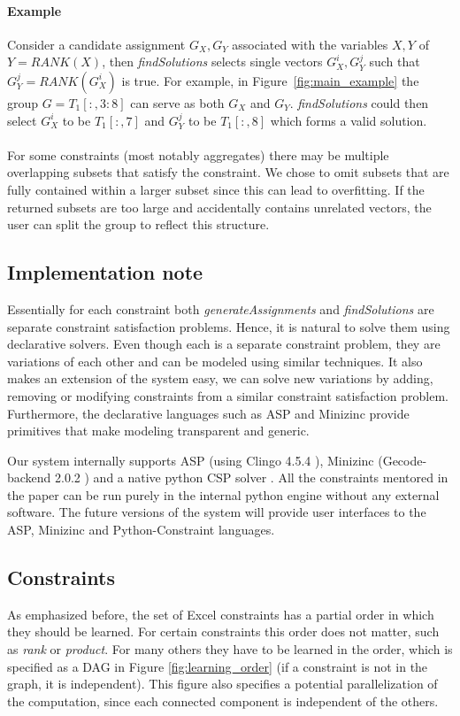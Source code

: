 \documentclass{ecai}
\newcommand{\format}[1]{\textit{#1}\xspace}
\newcommand{\generategroups}{\format{generateAssignments}}
\newcommand{\findassignment}{\format{findSolutions}}
\newcommand{\range}[3]{\ensuremath{#1[#2,#3]}}
\newcommand{\rangeto}[2]{#1{:}#2}
\newcommand{\rangeall}{:}
\newcommand{\ecrank}[2]{\ensuremath{#1 = \mathit{RANK}(#2)}}
\begin{document}
\paragraph{Example}
Consider a candidate assignment $G_X, G_Y$ associated with the variables $X,Y$ of \ecrank{Y}{X}, then \findassignment selects single vectors $G_X^{i}, G_Y^{j}$ such that \ecrank{G_Y^{j}}{G_X^{i}} is true.
For example, in Figure~\ref{fig:main_example} the group $G = \range{T_1}{\rangeall}{\rangeto{3}{8}}$ can serve as both $G_X$ and $G_Y$.
\findassignment could then select $G_X^{i}$ to be $\range{T_1}{\rangeall}{7}$ and $G_Y^{j}$ to be $\range{T_1}{\rangeall}{8}$ which forms a valid solution.
\\\\
For some constraints (most notably aggregates) there may be multiple overlapping subsets that satisfy the constraint.
We chose to omit subsets that are fully contained within a larger subset since this can lead to overfitting.
If the returned subsets are too large and accidentally contains unrelated vectors, the user can split the group to reflect this structure.

\subsection{Implementation note} Essentially for each constraint both \generategroups and \findassignment are separate constraint satisfaction problems. Hence, it is natural to solve them using declarative solvers. Even though each is a separate constraint problem, they are variations of each other and can be modeled using similar techniques. It also makes an extension of the system easy, we can solve new variations by adding, removing or modifying constraints from a similar constraint satisfaction problem. Furthermore, the declarative languages such as ASP \cite{whaisasp} and Minizinc \cite{minizinc} provide primitives that make modeling transparent and generic.

Our system internally supports ASP (using Clingo 4.5.4 \cite{clingo}), Minizinc (Gecode-backend 2.0.2 \cite{minizinc}) and a native python CSP solver \cite{python_constraint}. All the constraints mentored in the paper can be run purely in the internal python engine without any external software. The future versions of the system will provide user interfaces to the ASP, Minizinc and Python-Constraint languages.

\subsection{Constraints}
As emphasized before, the set of Excel constraints has a partial order in which they should be learned. For certain constraints this order does not matter, such as \textit{rank} or \textit{product}. For many others they have to be learned in the order, which is specified as a DAG in Figure \ref{fig:learning_order} (if a constraint is not in the graph, it is independent). This figure also specifies a potential parallelization of the computation, since each connected component is independent of the others.
\end{document}
